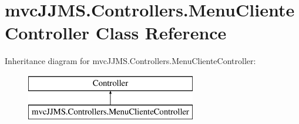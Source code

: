 \hypertarget{classmvc_j_j_m_s_1_1_controllers_1_1_menu_cliente_controller}{}\section{mvc\+J\+J\+M\+S.\+Controllers.\+Menu\+Cliente\+Controller Class Reference}
\label{classmvc_j_j_m_s_1_1_controllers_1_1_menu_cliente_controller}
Inheritance diagram for mvc\+J\+J\+M\+S.\+Controllers.\+Menu\+Cliente\+Controller\+:\begin{figure}[H]
\begin{center}
\leavevmode
\includegraphics[height=2.000000cm]{classmvc_j_j_m_s_1_1_controllers_1_1_menu_cliente_controller}
\end{center}
\end{figure}
